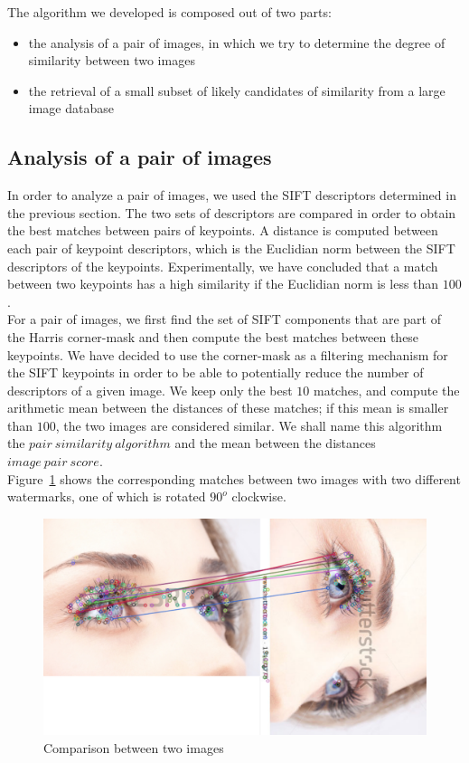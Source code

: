 \documentclass[conference]{IEEEtran}
\begin{document}
The algorithm we developed is composed out of two parts:
\begin{itemize}
	\item the analysis of a pair of images, in which we try to determine the degree of similarity between two images
	\item the retrieval of a small subset of likely candidates of similarity from a large image database
\end{itemize}

\subsection{Analysis of a pair of images}
In order to analyze a pair of images, we used the SIFT descriptors determined in the previous section. The two sets of descriptors are compared in order to obtain the best matches between pairs of keypoints. A distance is computed between each pair of keypoint descriptors, which is the Euclidian norm between the SIFT descriptors of the keypoints. Experimentally, we have concluded that a match between two keypoints has a high similarity if the Euclidian norm is less than $100$.\\
For a pair of images, we first find the set of SIFT components that are part of the Harris corner-mask and then compute the best matches between these keypoints. We have decided to use the corner-mask as a filtering mechanism for the SIFT keypoints in order to be able to potentially reduce the number of descriptors of a given image. We keep only the best $10$ matches, and compute the arithmetic mean between the distances of these matches; if this mean is smaller than $100$, the two images are considered similar. We shall name this algorithm the $pair\ similarity\ algorithm$ and the mean between the distances $image\ pair\ score$.\\
Figure~\ref{fig:compareImages} shows the corresponding matches between two images with two different watermarks, one of which is rotated $90^o$ clockwise.

\begin{figure}[ht!]
\centering
\includegraphics[width=.8\linewidth]{images/compare.png}
\caption{Comparison between two images}
\label{fig:compareImages}
\end{figure}
\end{document}
